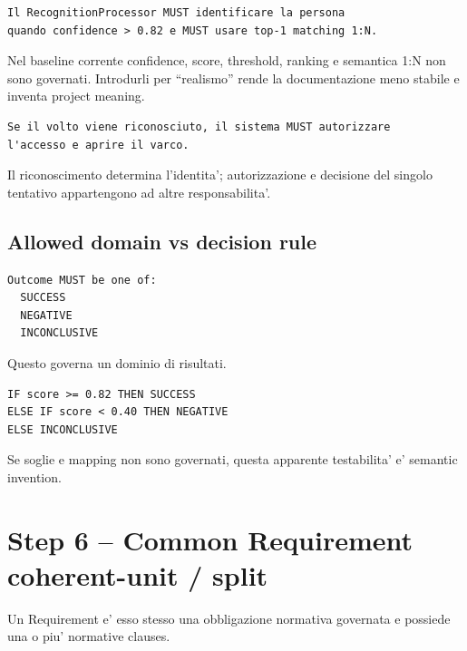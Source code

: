 \documentclass[11pt,a4paper]{article}
\begin{document}
\begin{badbox}
\begin{lstlisting}
Il RecognitionProcessor MUST identificare la persona
quando confidence > 0.82 e MUST usare top-1 matching 1:N.
\end{lstlisting}
Nel baseline corrente confidence, score, threshold, ranking e semantica 1:N non sono governati. Introdurli per ``realismo'' rende la documentazione meno stabile e inventa project meaning.
\end{badbox}

\begin{badbox}
\begin{lstlisting}
Se il volto viene riconosciuto, il sistema MUST autorizzare
l'accesso e aprire il varco.
\end{lstlisting}
Il riconoscimento determina l'identita'; autorizzazione e decisione del singolo tentativo appartengono ad altre responsabilita'.
\end{badbox}

\subsection{Allowed domain vs decision rule}

\begin{goodbox}
\begin{lstlisting}
Outcome MUST be one of:
  SUCCESS
  NEGATIVE
  INCONCLUSIVE
\end{lstlisting}
Questo governa un dominio di risultati.
\end{goodbox}

\begin{badbox}
\begin{lstlisting}
IF score >= 0.82 THEN SUCCESS
ELSE IF score < 0.40 THEN NEGATIVE
ELSE INCONCLUSIVE
\end{lstlisting}
Se soglie e mapping non sono governati, questa apparente testabilita' e' semantic invention.
\end{badbox}

\section{Step 6 -- Common Requirement coherent-unit / split}

\begin{statusclosed}[S1.5-A CLOSED]
Un Requirement e' esso stesso una obbligazione normativa governata e possiede una o piu' normative clauses.
\end{statusclosed}
\end{document}
